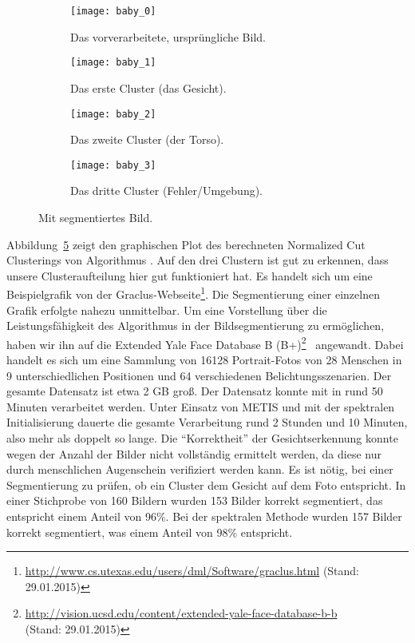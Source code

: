 \begin{figure}[t]
        \centering
        \begin{subfigure}[b]{0.5\textwidth}
        		\centering
                \texttt{[image: baby\_0]}
                \caption{Das vorverarbeitete, ursprüngliche Bild.}
                \label{fig:imageseg-kkmpp-k-3-a}
        \end{subfigure}%
        \begin{subfigure}[b]{0.5\textwidth}
        		\centering
                \texttt{[image: baby\_1]}
                \caption{Das erste Cluster (das Gesicht).}
                \label{fig:imageseg-kkmpp-k-3-b}
        \end{subfigure}
        \begin{subfigure}[b]{0.5\textwidth}
        		\centering
                \texttt{[image: baby\_2]}
                \caption{Das zweite Cluster (der Torso).}
                \label{fig:imageseg-kkmpp-k-3-c}
        \end{subfigure}%
        \begin{subfigure}[b]{0.5\textwidth}
        		\centering
                \texttt{[image: baby\_3]}
                \caption{Das dritte Cluster (Fehler/Umgebung).}
                \label{fig:imageseg-kkmpp-k-3-d}
        \end{subfigure}
\caption{Mit \kkmpp{} segmentiertes Bild.}
\label{fig:imageseg-kkmpp}
\end{figure}
Abbildung~\ref{fig:imageseg-kkmpp} zeigt den graphischen Plot des berechneten Normalized Cut Clusterings von
Algorithmus \kkmpp. Auf den drei Clustern ist gut zu erkennen, dass unsere Clusteraufteilung hier gut funktioniert hat. Es
handelt sich um eine Beispielgrafik von der
Graclus-Webseite\footnote{\url{http://www.cs.utexas.edu/users/dml/Software/graclus.html} (Stand: 29.01.2015)}.
\absatz
Die Segmentierung einer einzelnen Grafik erfolgte nahezu unmittelbar. Um eine Vorstellung über die Leistungsfähigkeit des
Algorithmus in der Bildsegmentierung zu ermöglichen, haben wir ihn auf die
Extended Yale Face Database B (B+)\footnote{\url{http://vision.ucsd.edu/content/extended-yale-face-database-b-b}\\
(Stand: 29.01.2015)}~\cite{GeorghiadesBK01} angewandt. Dabei handelt es sich um eine Sammlung von 16128 Portrait-Fotos von
28 Menschen in 9 unterschiedlichen Positionen und 64 verschiedenen Belichtungsszenarien. Der gesamte Datensatz ist etwa
2 GB groß. Der Datensatz konnte mit \kkmpp{} in rund 50 Minuten verarbeitet werden. Unter Einsatz von METIS und mit
der spektralen Initialisierung dauerte die gesamte Verarbeitung rund 2 Stunden und 10 Minuten, also mehr als doppelt so lange.
Die "`Korrektheit"' der Gesichtserkennung konnte wegen der Anzahl der Bilder nicht vollständig ermittelt werden, da diese nur
durch menschlichen Augenschein verifiziert werden kann. Es ist nötig, bei einer Segmentierung zu prüfen, ob ein Cluster
dem Gesicht auf dem Foto entspricht.
In einer Stichprobe von 160 Bildern wurden 153 Bilder korrekt segmentiert, das entspricht einem Anteil von 96\%.
Bei der spektralen Methode wurden 157 Bilder korrekt segmentiert, was einem Anteil von 98\% entspricht.

